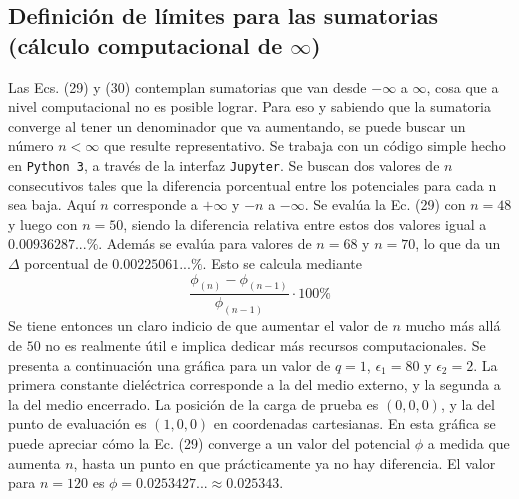 \documentclass[12pt, notitlepage]{article}
\begin{document}
\subsection{Definición de límites para las sumatorias (cálculo computacional de $\infty$)}
Las Ecs. (29) y (30) contemplan sumatorias que van desde $-\infty$ a $\infty$, cosa que a nivel computacional no es posible lograr. Para eso y sabiendo que la sumatoria converge al tener un denominador que va aumentando, se puede buscar un número $n < \infty$ que resulte representativo. Se trabaja con un código simple hecho en \texttt{Python 3}, a través de la interfaz \texttt{Jupyter}. Se buscan dos valores de $n$ consecutivos tales que la diferencia porcentual entre los potenciales para cada n sea baja. Aquí $n$ corresponde a $+\infty$ y $-n$ a $-\infty$. Se evalúa la Ec. (29) con $n = 48$ y luego con $n=50$, siendo la diferencia relativa entre estos dos valores igual a $0.00936287...\%$. Además se evalúa para valores de $n = 68$ y $n=70$, lo que da un $\Delta$ porcentual de $0.00225061...\%$. Esto se calcula mediante
\begin{equation*}
\frac{\phi_{(n)} - \phi_{(n-1)}}{\phi_{(n-1)}}\cdot 100\%
\end{equation*}
Se tiene entonces un claro indicio de que aumentar el valor de $n$ mucho más allá de $50$ no es realmente útil e implica dedicar más recursos computacionales. Se presenta a continuación una gráfica para un valor de $q=1$, $\epsilon_1 = 80$ y $\epsilon_2 = 2$. La primera constante dieléctrica corresponde a la del medio externo, y la segunda a la del medio encerrado. La posición de la carga de prueba es $(0,0,0)$, y la del punto de evaluación es $(1,0,0)$ en coordenadas cartesianas. En esta gráfica se puede apreciar cómo la Ec. (29) converge a un valor del potencial $\phi$ a medida que aumenta $n$, hasta un punto en que prácticamente ya no hay diferencia. El valor para $n=120$ es $\phi = 0.0253427...\approx 0.025343$.
\end{document}
